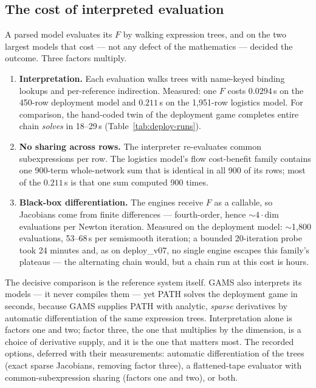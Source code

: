 \subsection{The cost of interpreted evaluation}
\label{sec:t-gms-cost}

A parsed model evaluates its $F$ by walking expression trees, and on the
two largest models that cost --- not any defect of the mathematics ---
decided the outcome. Three factors multiply.

\begin{enumerate}
\item \textbf{Interpretation.} Each evaluation walks  trees
  with name-keyed binding lookups and per-reference indirection. Measured:
  one $F$ costs $0.0294$\,s on the 450-row deployment model and
  $0.211$\,s on the 1{,}951-row logistics model. For comparison, the
  hand-coded twin of the deployment game completes entire chain
  \emph{solves} in 18--29\,s (Table~\ref{tab:deploy-runs}).
\item \textbf{No sharing across rows.} The interpreter re-evaluates
  common subexpressions per row. The logistics model's flow
  cost-benefit family contains one 900-term whole-network sum that is
  identical in all 900 of its rows; most of the $0.211$\,s is that one
  sum computed 900 times.
\item \textbf{Black-box differentiation.} The engines receive $F$ as a
  callable, so Jacobians come from finite differences --- fourth-order,
  hence $\sim 4 \cdot \mathrm{dim}$ evaluations per Newton iteration.
  Measured on the deployment model: $\sim$1{,}800 evaluations, 53--68\,s
  per semismooth iteration; a bounded 20-iteration probe took 24 minutes
  and, as on deploy\_v07, no single engine escapes this family's plateaus
  --- the alternating chain would, but a chain run at this cost is hours.
\end{enumerate}

The decisive comparison is the reference system itself. GAMS also
interprets its models --- it never compiles them --- yet PATH solves the
deployment game in seconds, because GAMS supplies PATH with analytic,
\emph{sparse} derivatives by automatic differentiation of the same
expression trees. Interpretation alone is factors one and two; factor
three, the one that multiplies by the dimension, is a choice of
derivative supply, and it is the one that matters most. The recorded
options, deferred with their measurements: automatic differentiation of
the  trees (exact sparse Jacobians, removing factor three), a
flattened-tape evaluator with common-subexpression sharing (factors one
and two), or both.

